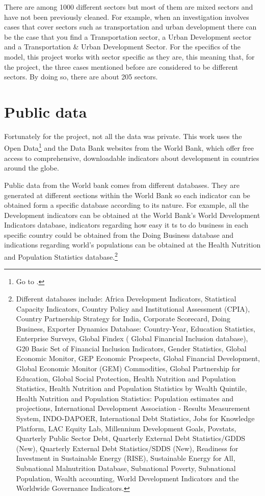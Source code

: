There are among 1000 different sectors but most of them are mixed sectors and have not been previously cleaned. For example, when an investigation involves cases that cover sectors such as transportation and urban development there can be the case that you find a Transportation sector, a Urban Development sector and a Transportation \& Urban Development Sector. For the specifics of the model, this project works with sector specific as they are, this meaning that, for the project, the three cases mentioned before are considered to be different sectors. By doing so, there are about 205 sectors.


\section{Public data}\label{sec_public_data}



Fortunately for the project, not all the data was private. This work uses the Open Data\footnote{Go to \cite{wb_data}.}  and the Data Bank websites from the World Bank, which offer free access to comprehensive, downloadable indicators about development in countries around the globe. 

Public data from the World bank comes from different databases. They are generated at different sections within the World Bank so each indicator can be obtained form a specific database according to its nature. For example, all the Development indicators can be obtained at the World Bank's World Development Indicators database, indicators regarding how easy it ts to do business in each specific country could be obtained from the Doing Business database and indications regarding world's populations can be obtained at the Health Nutrition and Population Statistics database.\footnote{Different databases include:
Africa Development Indicators, Statistical Capacity Indicators, Country Policy and Institutional Assessment (CPIA), Country Partnership Strategy for India, Corporate Scorecard, Doing Business, Exporter Dynamics Database: Country-Year, Education Statistics, Enterprise Surveys, Global Findex ( Global Financial Inclusion database), G20 Basic Set of Financial Inclusion Indicators, Gender Statistics, Global Economic Monitor, GEP Economic Prospects, Global Financial Development, Global Economic Monitor (GEM) Commodities, Global Partnership for Education, Global Social Protection, Health Nutrition and Population Statistics, Health Nutrition and Population Statistics by Wealth Quintile, Health Nutrition and Population Statistics: Population estimates and projections, International Development Association - Results Measurement System, INDO-DAPOER, International Debt Statistics, Jobs for Knowledge Platform, LAC Equity Lab, Millennium Development Goals, Povstats, Quarterly Public Sector Debt, Quarterly External Debt Statistics/GDDS (New), Quarterly External Debt Statistics/SDDS (New), Readiness for Investment in Sustainable Energy (RISE), Sustainable Energy for All, Subnational Malnutrition Database, Subnational Poverty, Subnational Population, Wealth accounting, World Development Indicators and the  Worldwide Governance Indicators.}

